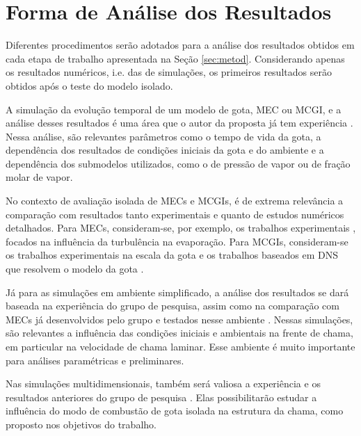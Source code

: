 
\section{Forma de Análise dos Resultados} \label{sec:resultados}

Diferentes procedimentos serão adotados para a análise dos resultados obtidos em cada etapa de trabalho apresentada na Seção \ref{sec:metod}.
Considerando apenas os resultados numéricos, i.e. das de simulações, os primeiros resultados serão obtidos após o teste do modelo isolado.

A simulação da evolução temporal de um modelo de gota, MEC ou MCGI, e a análise desses resultados é uma área que o autor da proposta já tem experiência \cite{HenningsJ2024MT}. 
Nessa análise, são relevantes parâmetros como o tempo de vida da gota, a dependência dos resultados de condições iniciais da gota e do ambiente e a dependência dos submodelos utilizados, como o de pressão de vapor ou de fração molar de vapor.

No contexto de avaliação isolada de MECs e MCGIs, é de extrema relevância a comparação com resultados tanto experimentais e quanto de estudos numéricos detalhados.
Para MECs, consideram-se, por exemplo, os trabalhos experimentais \cite{BiroukM2006,PatelU2019,KayaEyiceD2024,ArabkhalajA2024,MaquaC2008}, focados na influência da turbulência na evaporação.
Para MCGIs, consideram-se os trabalhos experimentais na escala da gota \cite{ChoS1990SCI,CandelS1999,ChenG1996CF,Xu2002,BiroukM2000,CuociA2005,SetyawanH2015} e os trabalhos baseados em DNS que resolvem o modelo da gota \cite{Stauch2006,CuociA2005,ChoS1990SCI,KazakovA2003CF,MarcheseA1996CF,WangW2024}.

Já para as simulações em ambiente simplificado, a análise dos resultados se dará baseada na experiência do grupo de pesquisa, assim como na comparação com MECs já desenvolvidos pelo grupo e testados nesse ambiente \cite{SacomanoF2018CTM,SacomanoF2019IJHMT,SacomanoF2021Fluids,SacomanoF2024CF,SacomanoF2025CF}.
Nessas simulações, são relevantes a influência das condições iniciais e ambientais na frente de chama, em particular na velocidade de chama laminar.
Esse ambiente é muito importante para análises paramétricas e preliminares.

Nas simulações multidimensionais, também será valiosa a experiência e os resultados anteriores do grupo de pesquisa \cite{SacomanoF2017CF,SacomanoF2020CF}.
Elas possibilitarão estudar a influência do modo de combustão de gota isolada na estrutura da chama, como proposto nos objetivos do trabalho.